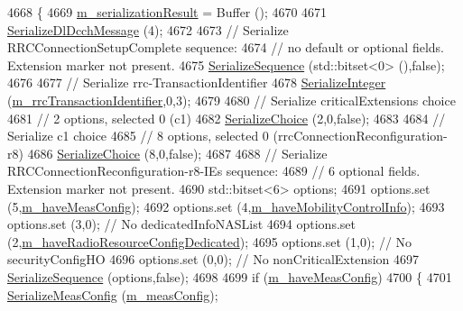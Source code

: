 \begin{DoxyCode}
4668 \{
4669   \hyperlink{classns3_1_1Asn1Header_a758b74023ea5bf40941af6f0a6a66058}{m\_serializationResult} = Buffer ();
4670 
4671   \hyperlink{classns3_1_1RrcDlDcchMessage_ae489863869038874910c89a7b54758cd}{SerializeDlDcchMessage} (4);
4672 
4673   \textcolor{comment}{// Serialize RRCConnectionSetupComplete sequence:}
4674   \textcolor{comment}{// no default or optional fields. Extension marker not present.}
4675   \hyperlink{classns3_1_1Asn1Header_aa9744858380443ed95836fed08799aed}{SerializeSequence} (std::bitset<0> (),\textcolor{keyword}{false});
4676 
4677   \textcolor{comment}{// Serialize rrc-TransactionIdentifier}
4678   \hyperlink{classns3_1_1Asn1Header_ab1c3bd37730affa7473bc759d625c29a}{SerializeInteger} (\hyperlink{classns3_1_1RrcConnectionReconfigurationHeader_ae6f276694b1b97f017227127d196cd2a}{m\_rrcTransactionIdentifier},0,3);
4679 
4680   \textcolor{comment}{// Serialize criticalExtensions choice}
4681   \textcolor{comment}{// 2 options, selected 0 (c1)}
4682   \hyperlink{classns3_1_1Asn1Header_a400ef4a710499da80fc55e23a973d4fa}{SerializeChoice} (2,0,\textcolor{keyword}{false});
4683 
4684   \textcolor{comment}{// Serialize c1 choice}
4685   \textcolor{comment}{// 8 options, selected 0 (rrcConnectionReconfiguration-r8)}
4686   \hyperlink{classns3_1_1Asn1Header_a400ef4a710499da80fc55e23a973d4fa}{SerializeChoice} (8,0,\textcolor{keyword}{false});
4687 
4688   \textcolor{comment}{// Serialize RRCConnectionReconfiguration-r8-IEs sequence:}
4689   \textcolor{comment}{// 6 optional fields. Extension marker not present.}
4690   std::bitset<6> options;
4691   options.set (5,\hyperlink{classns3_1_1RrcConnectionReconfigurationHeader_a274b29c01be85788f4857565cf9e05c5}{m\_haveMeasConfig});
4692   options.set (4,\hyperlink{classns3_1_1RrcConnectionReconfigurationHeader_a9028689c10df4671430dbc0179a971bd}{m\_haveMobilityControlInfo});
4693   options.set (3,0); \textcolor{comment}{// No dedicatedInfoNASList}
4694   options.set (2,\hyperlink{classns3_1_1RrcConnectionReconfigurationHeader_ad160e4e3e27c9795c223fc97f3e69d41}{m\_haveRadioResourceConfigDedicated});
4695   options.set (1,0); \textcolor{comment}{// No securityConfigHO}
4696   options.set (0,0); \textcolor{comment}{// No nonCriticalExtension}
4697   \hyperlink{classns3_1_1Asn1Header_aa9744858380443ed95836fed08799aed}{SerializeSequence} (options,\textcolor{keyword}{false});
4698 
4699   \textcolor{keywordflow}{if} (\hyperlink{classns3_1_1RrcConnectionReconfigurationHeader_a274b29c01be85788f4857565cf9e05c5}{m\_haveMeasConfig})
4700     \{
4701       \hyperlink{classns3_1_1RrcAsn1Header_a65f753653303d80ab92df652b8414350}{SerializeMeasConfig} (\hyperlink{classns3_1_1RrcConnectionReconfigurationHeader_a5fd4a46dd4c2fdefd5fdaa4d6f51a198}{m\_measConfig});

\end{DoxyCode}
